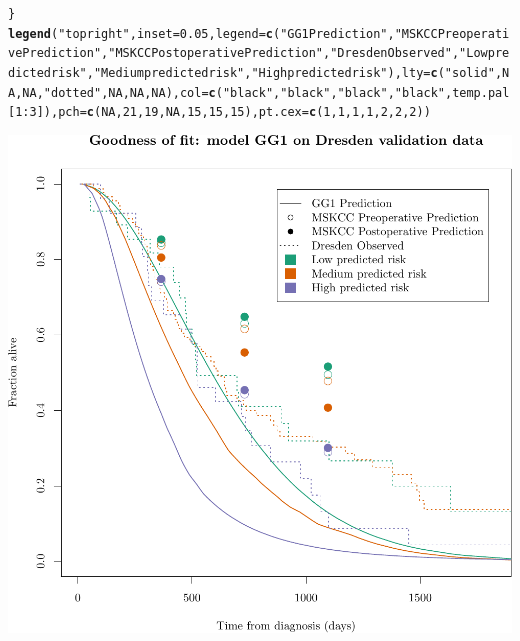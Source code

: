 \documentclass{article}\usepackage[]{graphicx}\usepackage[]{color}
\makeatletter
\def\maxwidth{ %
  \ifdim\Gin@nat@width>\linewidth
    \linewidth
  \else
    \Gin@nat@width
  \fi
}
\newcommand{\hlnum}[1]{\textcolor[rgb]{0.686,0.059,0.569}{#1}}%
\newcommand{\hlstr}[1]{\textcolor[rgb]{0.192,0.494,0.8}{#1}}%
\newcommand{\hlopt}[1]{\textcolor[rgb]{0,0,0}{#1}}%
\newcommand{\hlstd}[1]{\textcolor[rgb]{0.345,0.345,0.345}{#1}}%
\newcommand{\hlkwc}[1]{\textcolor[rgb]{0.333,0.667,0.333}{#1}}%
\newcommand{\hlkwd}[1]{\textcolor[rgb]{0.737,0.353,0.396}{\textbf{#1}}}%
\newenvironment{kframe}{%
 \def\at@end@of@kframe{}%
 \ifinner\ifhmode%
  \def\at@end@of@kframe{\end{minipage}}%
  \begin{minipage}{\columnwidth}%
 \fi\fi%
 \def\FrameCommand##1{\hskip\@totalleftmargin \hskip-\fboxsep
 \colorbox{shadecolor}{##1}\hskip-\fboxsep
     \hskip-\linewidth \hskip-\@totalleftmargin \hskip\columnwidth}%
 \MakeFramed {\advance\hsize-\width
   \@totalleftmargin\z@ \linewidth\hsize
   \@setminipage}}%
 {\par\unskip\endMakeFramed%
 \at@end@of@kframe}
\newenvironment{knitrout}{}{} %
\makeatother
\begin{document}
\begin{knitrout}
\begin{kframe}
\begin{alltt}
\hlstd{\}}
\hlkwd{legend}\hlstd{(}\hlstr{"topright"}\hlstd{,} \hlkwc{inset} \hlstd{=} \hlnum{0.05}\hlstd{,} \hlkwc{legend} \hlstd{=} \hlkwd{c}\hlstd{(}\hlstr{"GG1 Prediction"}\hlstd{,} \hlstr{"MSKCC Preoperative Prediction"}\hlstd{,} \hlstr{"MSKCC Postoperative Prediction"}\hlstd{,} \hlstr{"Dresden Observed"}\hlstd{,} \hlstr{"Low predicted risk"}\hlstd{,} \hlstr{"Medium predicted risk"}\hlstd{,} \hlstr{"High predicted risk"}\hlstd{),} \hlkwc{lty} \hlstd{=} \hlkwd{c}\hlstd{(}\hlstr{"solid"}\hlstd{,} \hlnum{NA}\hlstd{,} \hlnum{NA}\hlstd{,} \hlstr{"dotted"}\hlstd{,} \hlnum{NA}\hlstd{,} \hlnum{NA}\hlstd{,} \hlnum{NA}\hlstd{),} \hlkwc{col} \hlstd{=} \hlkwd{c}\hlstd{(}\hlstr{"black"}\hlstd{,} \hlstr{"black"}\hlstd{,} \hlstr{"black"}\hlstd{,} \hlstr{"black"}\hlstd{, temp.pal[}\hlnum{1}\hlopt{:}\hlnum{3}\hlstd{]),} \hlkwc{pch} \hlstd{=} \hlkwd{c}\hlstd{(}\hlnum{NA}\hlstd{,} \hlnum{21}\hlstd{,} \hlnum{19}\hlstd{,} \hlnum{NA}\hlstd{,} \hlnum{15}\hlstd{,} \hlnum{15}\hlstd{,} \hlnum{15}\hlstd{),} \hlkwc{pt.cex} \hlstd{=} \hlkwd{c}\hlstd{(}\hlnum{1}\hlstd{,} \hlnum{1}\hlstd{,} \hlnum{1}\hlstd{,} \hlnum{1}\hlstd{,} \hlnum{2}\hlstd{,} \hlnum{2}\hlstd{,} \hlnum{2}\hlstd{))}
\end{alltt}
\end{kframe}

{\centering \includegraphics[width=\maxwidth]{figure/07-altman-4-dresden-1} 

}
\end{knitrout}
\end{document}
